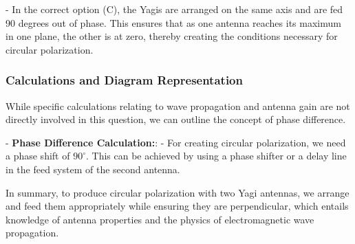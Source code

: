     - In the correct option (C), the Yagis are arranged on the same axis and are fed 90 degrees out of phase. This ensures that as one antenna reaches its maximum in one plane, the other is at zero, thereby creating the conditions necessary for circular polarization.

\subsubsection*{Calculations and Diagram Representation}

While specific calculations relating to wave propagation and antenna gain are not directly involved in this question, we can outline the concept of phase difference.

- \textbf{Phase Difference Calculation:}: 
    - For creating circular polarization, we need a phase shift of \(90^\circ\). This can be achieved by using a phase shifter or a delay line in the feed system of the second antenna.

\begin{center}
\end{center}

In summary, to produce circular polarization with two Yagi antennas, we arrange and feed them appropriately while ensuring they are perpendicular, which entails knowledge of antenna properties and the physics of electromagnetic wave propagation.